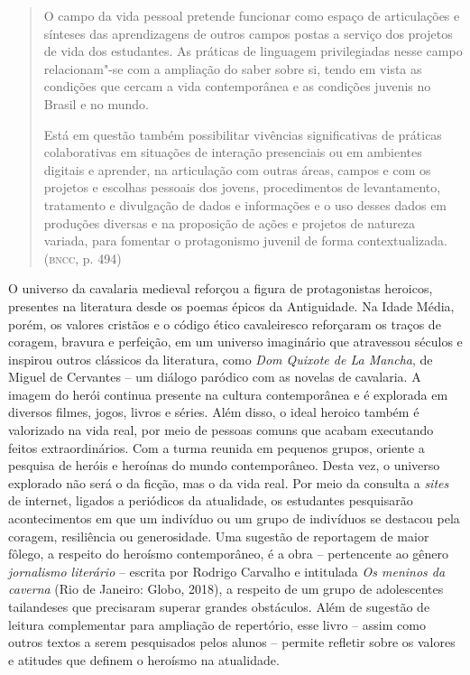 \documentclass{extarticle}
\begin{document}
\begin{quote}
O campo da vida pessoal pretende funcionar como espaço de articulações
e sínteses das aprendizagens de outros campos postas a serviço dos
projetos de vida dos estudantes. As práticas de linguagem privilegiadas
nesse campo relacionam"-se com a ampliação do saber sobre si, tendo em
vista as condições que cercam a vida contemporânea e as condições
juvenis no Brasil e no mundo.

Está em questão também possibilitar vivências significativas de práticas
colaborativas em situações de interação presenciais ou em ambientes
digitais e aprender, na articulação com outras áreas, campos e com os
projetos e escolhas pessoais dos jovens, procedimentos de levantamento,
tratamento e divulgação de dados e informações e o uso desses dados em
produções diversas e na proposição de ações e projetos de natureza
variada, para fomentar o protagonismo juvenil de forma
contextualizada. (\textsc{bncc}, p. 494)
\end{quote}

  O universo da cavalaria medieval reforçou a figura de protagonistas
  heroicos, presentes na literatura desde os poemas épicos da
  Antiguidade. Na Idade Média, porém, os valores cristãos e o código
  ético cavaleiresco reforçaram os traços de coragem, bravura e
  perfeição, em um universo imaginário que atravessou séculos e inspirou
  outros clássicos da literatura, como \emph{Dom Quixote de La Mancha},
  de Miguel de Cervantes -- um diálogo paródico com as novelas de
  cavalaria. A imagem do herói continua presente na cultura
  contemporânea e é explorada em diversos filmes, jogos, livros e
  séries. Além disso, o ideal heroico também é valorizado na vida real,
  por meio de pessoas comuns que acabam executando feitos
  extraordinários. Com a turma reunida em pequenos grupos, oriente a
  pesquisa de heróis e heroínas do mundo contemporâneo. Desta vez, o
  universo explorado não será o da ficção, mas o da vida real. Por meio
  da consulta a \emph{sites} de internet, ligados a periódicos da
  atualidade, os estudantes pesquisarão acontecimentos em que um
  indivíduo ou um grupo de indivíduos se destacou pela coragem,
  resiliência ou generosidade. Uma sugestão de reportagem de maior
  fôlego, a respeito do heroísmo contemporâneo, é a obra -- pertencente
  ao gênero \emph{jornalismo literário} -- escrita por Rodrigo Carvalho
  e intitulada \emph{Os meninos da caverna} (Rio de Janeiro: Globo,
  2018), a respeito de um grupo de adolescentes tailandeses que
  precisaram superar grandes obstáculos. Além de sugestão de leitura
  complementar para ampliação de repertório, esse livro -- assim como
  outros textos a serem pesquisados pelos alunos -- permite refletir
  sobre os valores e atitudes que definem o heroísmo na atualidade.
\end{document}
